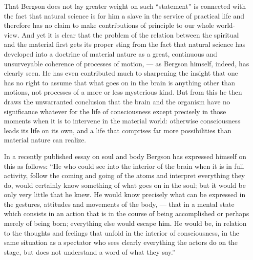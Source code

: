 \documentclass[12pt,a4paper,openany]{book}
\newcommand{\opage}[1]{\marginnote{\footnotesize\textit{[#1]}}}
\begin{document}
That Bergson does not lay greater weight on such ``statement'' is connected with the fact that natural science is for him a slave in the service of practical life and therefore has no claim to make contributions of principle to our whole world-view. And yet it is clear that the problem of the relation between the spiritual and the material first gets its proper sting from the fact that natural science has developed into a doctrine of material nature as a great, continuous and unsurveyable coherence of processes of motion, --- as Bergson himself, indeed, has clearly seen. He has even contributed much to sharpening the insight that one has no right to assume that what goes on in the brain is anything other than motions, not processes of a more or less mysterious kind. But from this he then draws the unwarranted conclusion that the brain and the organism have no significance whatever for the life of consciousness except precisely in those moments %
when it is to intervene in the material world: otherwise consciousness leads its life on its own, and
\opage{33}a life that comprises far more possibilities than material nature can realize.

In a recently published essay on soul and body Bergson has expressed himself on this as follows: ``He who could see into the interior of the brain when it is in full activity, follow the coming and going of the atoms and interpret everything they do, would certainly know something of what goes on in the soul; but it would be only very little that he knew. He would know precisely what can be expressed in the gestures, attitudes and movements of the body, --- that in a mental state which consists in an action that is in the course of being accomplished or perhaps merely of being born; everything else would escape him. He would be, in relation to the thoughts and feelings that unfold in the interior of consciousness, in the same situation as a spectator who sees clearly everything the actors do on the stage, but does not understand a word of what they say.''
\end{document}
